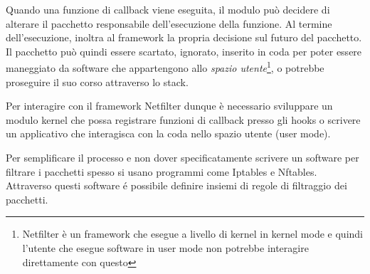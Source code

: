 Quando una funzione di callback viene eseguita, il modulo può decidere di alterare il pacchetto responsabile dell'esecuzione della funzione. Al termine dell'esecuzione, inoltra al framework la propria decisione sul futuro del pacchetto. Il pacchetto può quindi essere scartato, ignorato, inserito in coda per poter essere maneggiato da software che appartengono allo \textit{spazio utente}\footnote{Netfilter è un framework che esegue a livello di kernel  in kernel mode e quindi l'utente che esegue software in user mode non potrebbe interagire direttamente con questo}, o potrebbe proseguire il suo corso attraverso lo stack.

Per interagire con il framework Netfilter dunque è necessario sviluppare un modulo kernel che possa registrare funzioni di callback presso gli hooks o scrivere un applicativo che interagisca con la coda nello spazio utente (user mode).

Per semplificare il processo e non dover specificatamente scrivere un software per  filtrare  i pacchetti spesso si usano programmi come Iptables e Nftables. Attraverso questi software é possibile definire insiemi di regole di filtraggio dei pacchetti.

